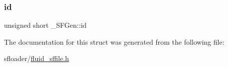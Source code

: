 \mbox{\label{struct__SFGen_a3b54dafd1bbf1c18e002c78dcda927cd}} 
\subsubsection{\texorpdfstring{id}{id}}
{\footnotesize\ttfamily unsigned short \+\_\+\+S\+F\+Gen\+::id}



The documentation for this struct was generated from the following file\+:\begin{DoxyCompactItemize}
\item 
sfloader/\hyperlink{fluid__sffile_8h}{fluid\+\_\+sffile.\+h}\end{DoxyCompactItemize}
